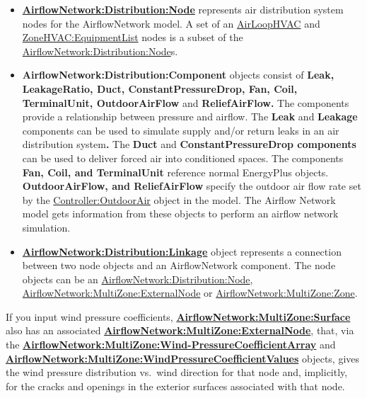\begin{itemize}
\item
  \textbf{\hyperref[airflownetworkdistributionnode]{AirflowNetwork:Distribution:Node}} represents air distribution system nodes for the AirflowNetwork model. A set of an \hyperref[airloophvac]{AirLoopHVAC} and \hyperref[zonehvacequipmentlist]{ZoneHVAC:EquipmentList} nodes is a subset of the \hyperref[airflownetworkdistributionnode]{AirflowNetwork:Distribution:Node}s.
\item
  \textbf{AirflowNetwork:Distribution:Component} objects consist of \textbf{Leak, LeakageRatio, Duct, ConstantPressureDrop, Fan, Coil, TerminalUnit, OutdoorAirFlow} and \textbf{ReliefAirFlow.} The components provide a relationship between pressure and airflow. The \textbf{Leak} and \textbf{Leakage} components can be used to simulate supply and/or return leaks in an air distribution system\textbf{.} The \textbf{Duct} and \textbf{ConstantPressureDrop components} can be used to deliver forced air into conditioned spaces. The components \textbf{Fan, Coil, and TerminalUnit} reference normal EnergyPlus objects. \textbf{OutdoorAirFlow, and ReliefAirFlow} specify the outdoor air flow rate set by the \hyperref[controlleroutdoorair]{Controller:OutdoorAir} object in the model. The Airflow Network model gets information from these objects to perform an airflow network simulation.
\item
  \textbf{\hyperref[airflownetworkdistributionlinkage]{AirflowNetwork:Distribution:Linkage}} object represents a connection between two node objects and an AirflowNetwork component. The node objects can be an \hyperref[airflownetworkdistributionnode]{AirflowNetwork:Distribution:Node}, \hyperref[airflownetworkmultizoneexternalnode]{AirflowNetwork:MultiZone:ExternalNode} or \hyperref[airflownetworkmultizonezone]{AirflowNetwork:MultiZone:Zone}.
\end{itemize}

If you input wind pressure coefficients, \textbf{\hyperref[airflownetworkmultizonesurface]{AirflowNetwork:MultiZone:Surface}} also has an associated \textbf{\hyperref[airflownetworkmultizoneexternalnode]{AirflowNetwork:MultiZone:ExternalNode}}, that, via the \textbf{\hyperref[airflownetworkmultizonewindpressurecoefficientarray]{AirflowNetwork:MultiZone:Wind-PressureCoefficientArray}} and \textbf{\hyperref[airflownetworkmultizonewindpressurecoefficientvalues]{AirflowNetwork:MultiZone:WindPressureCoefficientValues}} objects, gives the wind pressure distribution vs.~wind direction for that node and, implicitly, for the cracks and openings in the exterior surfaces associated with that node.

